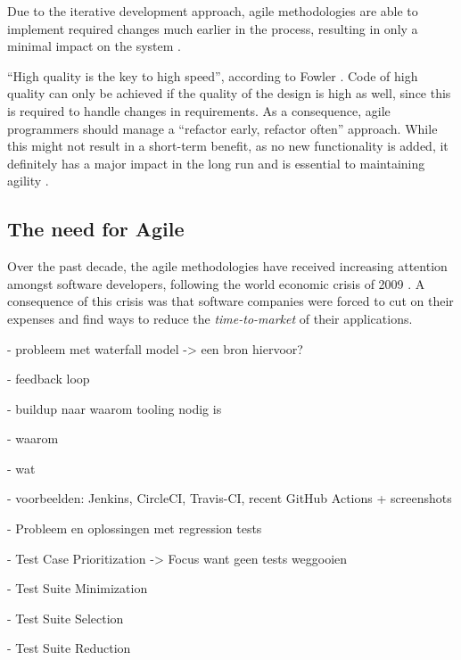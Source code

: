 Due to the iterative development approach, agile methodologies are able to implement required changes much earlier in the process, resulting in only a minimal impact on the system \cite{martin2014}. 

``High quality is the key to high speed'', according to Fowler \cite{martin2014}. Code of high quality can only be achieved if the quality of the design is high as well, since this is required to handle changes in requirements. As a consequence, agile programmers should manage a ``refactor early, refactor often'' approach. While this might not result in a short-term benefit, as no new functionality is added, it definitely has a major impact in the long run and is essential to maintaining agility \cite{fowlerhighsmithagile}.

\subsection{The need for Agile}
Over the past decade, the agile methodologies have received increasing attention amongst software developers, following the world economic crisis of 2009 \cite{ionel2009}. A consequence of this crisis was that software companies were forced to cut on their expenses and find ways to reduce the \emph{time-to-market} of their applications.



- probleem met waterfall model -> een bron hiervoor?

- feedback loop

- buildup naar waarom tooling nodig is

- waarom

- wat

- voorbeelden: Jenkins, CircleCI, Travis-CI, recent GitHub Actions + screenshots

- Probleem en oplossingen met regression tests

  - Test Case Prioritization -> Focus want geen tests weggooien
  
  - Test Suite Minimization
  
  - Test Suite Selection
  
  - Test Suite Reduction
